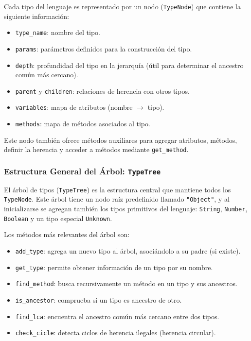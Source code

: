 \documentclass{article}
\begin{document}
Cada tipo del lenguaje es representado por un nodo (\texttt{TypeNode}) que contiene la siguiente información:

\begin{itemize}
    \item \texttt{type\_name}: nombre del tipo.
    \item \texttt{params}: parámetros definidos para la construcción del tipo.
    \item \texttt{depth}: profundidad del tipo en la jerarquía (útil para determinar el ancestro común más cercano).
    \item \texttt{parent} y \texttt{children}: relaciones de herencia con otros tipos.
    \item \texttt{variables}: mapa de atributos (nombre $\rightarrow$ tipo).
    \item \texttt{methods}: mapa de métodos asociados al tipo.
\end{itemize}

Este nodo también ofrece métodos auxiliares para agregar atributos, métodos, definir la herencia y acceder a métodos mediante \texttt{get\_method}.

\subsubsection*{Estructura General del Árbol: \texttt{TypeTree}}

El árbol de tipos (\texttt{TypeTree}) es la estructura central que mantiene todos los \texttt{TypeNode}. Este árbol tiene un nodo raíz predefinido llamado \texttt{"Object"}, y al inicializarse se agregan también los tipos primitivos del lenguaje: \texttt{String}, \texttt{Number}, \texttt{Boolean} y un tipo especial \texttt{Unknown}.

Los métodos más relevantes del árbol son:

\begin{itemize}
    \item \texttt{add\_type}: agrega un nuevo tipo al árbol, asociándolo a su padre (si existe).
    \item \texttt{get\_type}: permite obtener información de un tipo por su nombre.
    \item \texttt{find\_method}: busca recursivamente un método en un tipo y sus ancestros.
    \item \texttt{is\_ancestor}: comprueba si un tipo es ancestro de otro.
    \item \texttt{find\_lca}: encuentra el ancestro común más cercano entre dos tipos.
    \item \texttt{check\_cicle}: detecta ciclos de herencia ilegales (herencia circular).
\end{itemize}
\end{document}

